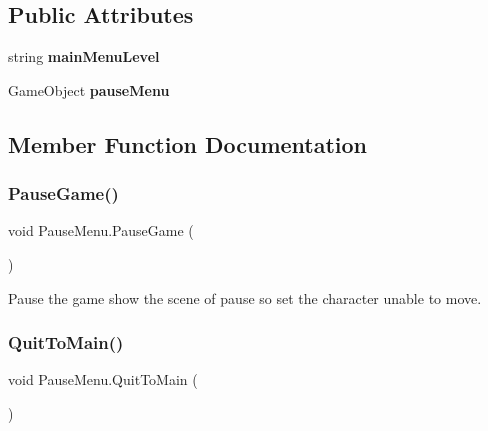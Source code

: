 \subsection*{Public Attributes}
\begin{DoxyCompactItemize}
\item 
\hypertarget{class_pause_menu_a2094d7e918365dad66cfa6d7d04051b0}{}\label{class_pause_menu_a2094d7e918365dad66cfa6d7d04051b0} 
string {\bfseries main\+Menu\+Level}
\item 
\hypertarget{class_pause_menu_a2a4732fd962c6aa136a867be16b71cc2}{}\label{class_pause_menu_a2a4732fd962c6aa136a867be16b71cc2} 
Game\+Object {\bfseries pause\+Menu}
\end{DoxyCompactItemize}


\subsection{Member Function Documentation}
\hypertarget{class_pause_menu_a2b86ff433ae3df8d0a717f3daa72943b}{}\label{class_pause_menu_a2b86ff433ae3df8d0a717f3daa72943b} 
\subsubsection{\texorpdfstring{Pause\+Game()}{PauseGame()}}
{\footnotesize\ttfamily void Pause\+Menu.\+Pause\+Game (\begin{DoxyParamCaption}{ }\end{DoxyParamCaption})}



Pause the game show the scene of pause so set the character unable to move. 

\hypertarget{class_pause_menu_ac78f101fedf5cda06a5b51bb87411737}{}\label{class_pause_menu_ac78f101fedf5cda06a5b51bb87411737} 
\subsubsection{\texorpdfstring{Quit\+To\+Main()}{QuitToMain()}}
{\footnotesize\ttfamily void Pause\+Menu.\+Quit\+To\+Main (\begin{DoxyParamCaption}{ }\end{DoxyParamCaption})}



